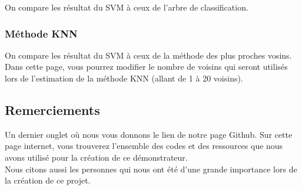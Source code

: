 \documentclass[]{article}
\begin{document}
On compare les résultat du SVM à ceux de l'arbre de classification.

\hypertarget{muxe9thode-knn}{%
\subsubsection{Méthode KNN}\label{muxe9thode-knn}}

On compare les résultat du SVM à ceux de la méthode des plus proches
vosins. Dans cette page, vous pourrez modifier le nombre de voisins qui
seront utilisés lors de l'estimation de la méthode KNN (allant de 1 à 20
voisins).

\hypertarget{remerciements}{%
\subsection{Remerciements}\label{remerciements}}

Un dernier onglet où nous vous donnons le lien de notre page Github. Sur
cette page internet, vous trouverez l'ensemble des codes et des
ressources que nous avons utilisé pour la création de ce
démonstrateur.\\
Nous citons aussi les personnes qui nous ont été d'une grande importance
lors de la création de ce projet.
\end{document}
